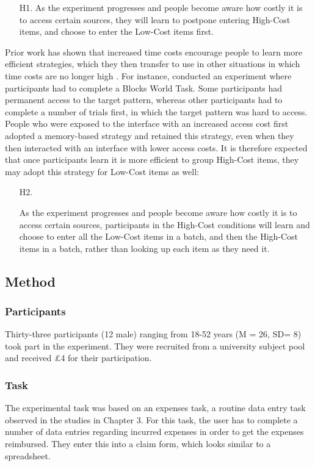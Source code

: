 \begin{itemize}
\item [H1.]
As the experiment progresses and people become aware how costly it is to access certain sources, they will learn to postpone entering High-Cost items, and choose to enter the Low-Cost items first. 
\end{itemize}

Prior work has shown that increased time costs encourage people to learn more efficient strategies, which they then transfer to use in other situations in which time costs are no longer high \citep{OHara1998, Patrick2014, Waldron2007}. For instance, \citet{Patrick2014} conducted an experiment where participants had to complete a Blocks World Task. Some participants had permanent access to the target pattern, whereas other participants had to complete a number of trials first, in which the target pattern was hard to access. People who were exposed to the interface with an increased access cost first adopted a memory-based strategy and retained this strategy, even when they then interacted with an interface with lower access costs. It is therefore expected that once participants learn it is more efficient to group High-Cost items, they may adopt this strategy for Low-Cost items as well:

\begin{itemize}
\item [H2.]

As the experiment progresses and people become aware how costly it is to access certain sources, participants in the High-Cost conditions will learn and choose to enter all the Low-Cost items in a batch, and then the High-Cost items in a batch, rather than looking up each item as they need it. 

\end{itemize}

\subsection{Method}
\subsubsection{Participants}
Thirty-three participants (12 male) ranging from 18-52 years (M = 26, SD= 8) took part in the experiment. They were recruited from a university subject pool and received $\pounds$4 for their participation.

\subsubsection{Task}
The experimental task was based on an expenses task, a routine data entry task observed in the studies in Chapter 3. For this task, the user has to complete a number of data entries regarding incurred expenses in order to get the expenses reimbursed. They enter this into a claim form, which looks similar to a spreadsheet. 

